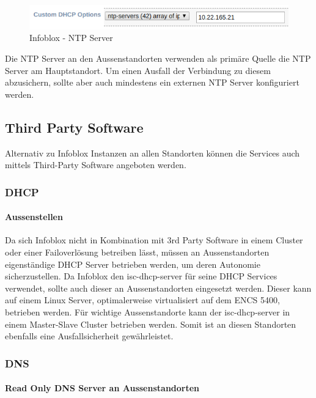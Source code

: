 \begin{figure}[H]
	\centering
	\includegraphics[width=0.8\linewidth]{img/Absicherung/Infoblox_NTP_Server.png}
	\caption{Infoblox - NTP Server }
	\label{fig:Infoblox - NTP Server}
\end{figure}

Die NTP Server an den Aussenstandorten verwenden als primäre Quelle die NTP Server am Hauptstandort. Um einen Ausfall der Verbindung zu diesem abzusichern, sollte aber auch mindestens ein externen NTP Server konfiguriert werden.

\subsection{Third Party Software}

Alternativ zu Infoblox Instanzen an allen Standorten können die Services auch mittels Third-Party Software angeboten werden.

\subsubsection{DHCP}

\paragraph{Aussenstellen}
Da sich Infoblox nicht in Kombination mit 3rd Party Software in einem Cluster oder einer Failoverlösung betreiben lässt, müssen an Aussenstandorten eigenständige DHCP Server betrieben werden, um deren Autonomie sicherzustellen. Da Infoblox den isc-dhcp-server für seine DHCP Services verwendet, sollte auch dieser an Aussenstandorten eingesetzt werden. Dieser kann auf einem Linux Server, optimalerweise virtualisiert auf dem ENCS 5400, betrieben werden.
Für wichtige Aussenstandorte kann der isc-dhcp-server in einem Master-Slave Cluster betrieben werden. Somit ist an diesen Standorten ebenfalls eine Ausfallsicherheit gewährleistet.

\subsubsection{DNS}

\paragraph{Read Only DNS Server an Aussenstandorten}
	
